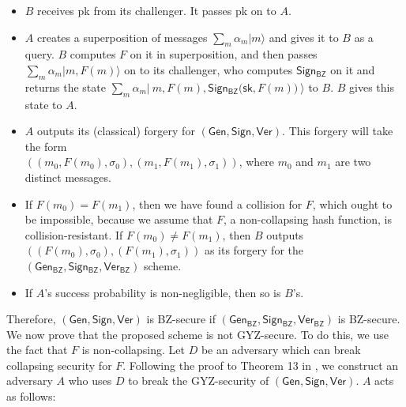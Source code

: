 \documentclass{article}
\begin{document}
\begin{itemize}
    \item $B$ receives \textsf{pk} from its challenger. It passes \textsf{pk} on to $A$.
    \item $A$ creates a superposition of messages $\sum_m \alpha_m | m \rangle$ and gives it to $B$ as a query. $B$ computes $F$ on it in superposition, and then passes $\sum_m \alpha_m | m, F(m) \rangle$ on to its challenger, who computes $\mathsf{Sign_{BZ}}$ on it and returns the state $\sum_m \alpha_m | \: m, F(m), \mathsf{Sign_{BZ}(sk}, F(m)) \: \rangle$ to $B$. $B$ gives this state to $A$.
    \item $A$ outputs its (classical) forgery for $\mathsf{(Gen, Sign, Ver)}$. This forgery will take the form \\ $((m_0, F(m_0), \sigma_0), (m_1, F(m_1), \sigma_1))$, where $m_0$ and $m_1$ are two distinct messages.
    \item If $F(m_0) = F(m_1)$, then we have found a collision for $F$, which ought to be impossible, because we assume that $F$, a non-collapsing hash function, is collision-resistant. If $F(m_0) \neq F(m_1)$, then $B$ outputs $((F(m_0), \sigma_0), (F(m_1), \sigma_1))$ as its forgery for the $\mathsf{(Gen_{BZ}, Sign_{BZ}, Ver_{BZ})}$ scheme.
    \item If $A$'s success probability is non-negligible, then so is $B$'s.
\end{itemize}

Therefore, $\mathsf{(Gen, Sign, Ver)}$ is BZ-secure if $\mathsf{(Gen_{BZ}, Sign_{BZ}, Ver_{BZ})}$ is BZ-secure. \\

We now prove that the proposed scheme is not GYZ-secure. To do this, we use the fact that $F$ is non-collapsing. Let $D$ be an adversary which can break collapsing security for $F$. Following the proof to Theorem 13 in \cite{gyz}, we construct an adversary $A$ who uses $D$ to break the GYZ-security of $\mathsf{(Gen, Sign, Ver)}$. $A$ acts as follows:
\end{document}
